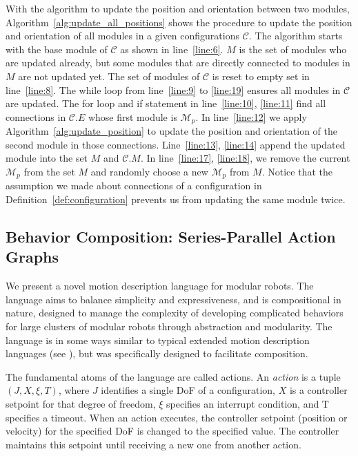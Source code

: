 \documentclass[conference]{IEEEtran}
\theoremstyle{definition}
\begin{document}
With the algorithm to update the position and orientation between two modules, Algorithm~\ref{alg:update_all_positions} shows the procedure to update the position and orientation of all modules in a given configurations $\mathcal{C}$. The algorithm starts with the base module of $\mathcal{C}$ as shown in line~\ref{line:6}. $M$ is the set of modules who are updated already, but some modules that are directly connected to modules in $M$ are not updated yet. The set of modules of $\mathcal{C}$ is reset to empty set in line~\ref{line:8}. The while loop from line~\ref{line:9} to \ref{line:19} ensures all modules in $\mathcal{C}$ are updated. The for loop and if statement in line~\ref{line:10}, \ref{line:11} find all connections in $\mathcal{C}.E$ whose first module is $\mathcal{M}_p$. In line~\ref{line:12} we apply Algorithm~\ref{alg:update_position} to update the position and orientation of the second module in those connections. Line~\ref{line:13}, \ref{line:14} append the updated module into the set $M$ and $\mathcal{C}.M$. In line~\ref{line:17}, \ref{line:18}, we remove the current $\mathcal{M}_p$ from the set $M$ and randomly choose a new $\mathcal{M}_p$ from $M$. Notice that the assumption we made about connections of a configuration in Definition~\ref{def:configuration} prevents us from updating the same module twice.


\subsection{Behavior Composition: Series-Parallel Action Graphs}
\label{sec:behavior-representation}
We present a novel motion description language for modular robots.  The
language aims to balance simplicity and expressiveness, and is compositional in
nature, designed to manage the complexity of developing complicated behaviors
for large clusters of modular robots through abstraction and modularity. The language
is in some ways similar to typical extended motion description languages (see \cite{hristu2003motion}),
but was specifically designed to facilitate  composition.
 
The fundamental atoms of the language are called actions.  An \textit{action} is a tuple \(
(J, X, \xi, T)\), where \(J\) identifies a single DoF of a configuration, \(X\) is a
controller setpoint for that degree of freedom, \(\xi\) specifies an interrupt
condition, and T specifies a timeout. When an action executes, the controller
setpoint (position or velocity) for the specified DoF is changed to the specified
value. The controller maintains this setpoint until receiving a new one from another
action. 
\end{document}
